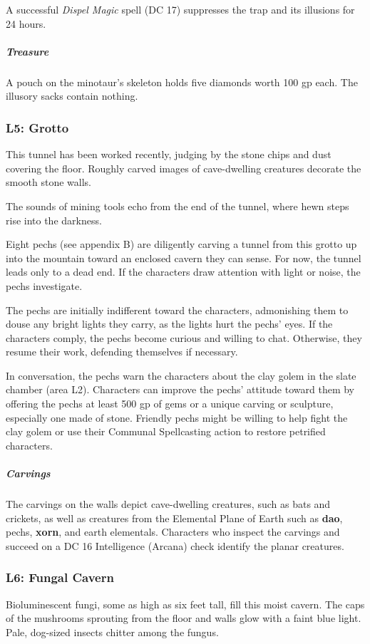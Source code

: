 \documentclass[10pt,a4paper,twoside,bg=print,twocolumn,openany,nodeprecatedcode]{dndbook}
\begin{document}
A successful \textit{Dispel Magic} spell (DC 17) suppresses the trap and its illusions for 24 hours.

\subparagraph{Treasure}
A pouch on the minotaur's skeleton holds five diamonds worth 100 gp each. The illusory sacks contain nothing.

\subsubsection{L5: Grotto}
\begin{DndReadAloud}{}
This tunnel has been worked recently, judging by the stone chips and dust covering the floor. Roughly carved images of cave-dwelling creatures decorate the smooth stone walls.

The sounds of mining tools echo from the end of the tunnel, where hewn steps rise into the darkness.

\end{DndReadAloud}

Eight pechs (see appendix B) are diligently carving a tunnel from this grotto up into the mountain toward an enclosed cavern they can sense. For now, the tunnel leads only to a dead end. If the characters draw attention with light or noise, the pechs investigate.

The pechs are initially indifferent toward the characters, admonishing them to douse any bright lights they carry, as the lights hurt the pechs' eyes. If the characters comply, the pechs become curious and willing to chat. Otherwise, they resume their work, defending themselves if necessary.

In conversation, the pechs warn the characters about the clay golem in the slate chamber (area L2). Characters can improve the pechs' attitude toward them by offering the pechs at least 500 gp of gems or a unique carving or sculpture, especially one made of stone. Friendly pechs might be willing to help fight the clay golem or use their Communal Spellcasting action to restore petrified characters.

\subparagraph{Carvings}
The carvings on the walls depict cave-dwelling creatures, such as bats and crickets, as well as creatures from the Elemental Plane of Earth such as \textbf{dao}, pechs, \textbf{xorn}, and earth elementals. Characters who inspect the carvings and succeed on a DC 16 Intelligence (Arcana) check identify the planar creatures.

\subsubsection{L6: Fungal Cavern}
\begin{DndReadAloud}{}
Bioluminescent fungi, some as high as six feet tall, fill this moist cavern. The caps of the mushrooms sprouting from the floor and walls glow with a faint blue light. Pale, dog-sized insects chitter among the fungus.

\end{DndReadAloud}
\end{document}
